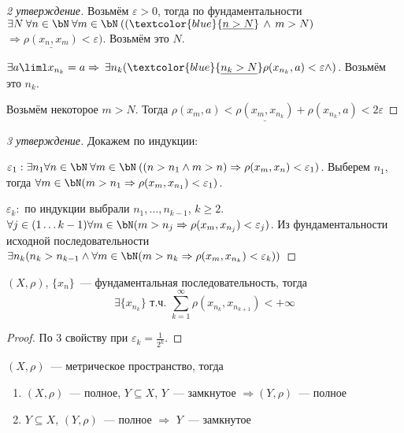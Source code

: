 \documentclass[document]{subfiles}
\begin{document}
\begin{proof}[2 утверждение]
    Возьмём $\varepsilon > 0$, тогда по фундаментальности $\exists N  \: \forall n \in \bN  \: \forall m \in \bN \: ((\textcolor{blue}{\underline{n > N}} \, \land \, m > N) $ $\Rightarrow \underline{\rho(x_n, x_m)} < \varepsilon)$. Возьмём это $N$.

    $\exists a \liml x_{n_k} = a \Rightarrow \: \exists n_k (\textcolor{blue}{\underline{n_k > N}} \rho(x_{n_k}, a) < \varepsilon \land )$. Возьмём это $n_k$.

    Возьмём некоторое $m > N$. Тогда $\rho(x_m, a) < \underline{\rho(x_m, x_{n_k})} + \rho(x_{n_k}, a) < 2 \varepsilon$
\end{proof}
\begin{proof}[3 утверждение]
    Докажем по индукции:

    $\varepsilon_1: \exists n_1 \forall n \in \bN \: \forall m \in \bN \: ((n > n_1 \land m > n) \Rightarrow \rho(x_m,x_n) < \varepsilon_1)$. Выберем $n_1$, тогда $\forall m \in \bN (m > n_1 \Rightarrow \rho(x_m, x_{n_1}) < \varepsilon_1)$.

    $\varepsilon_k:$ по индукции выбрали $n_1, \ldots, n_{k-1}$, $k \geq 2$. $\forall j \in ( 1 \ldots k-1 ) \forall m \in \bN (m > n_j \Rightarrow \rho (x_m, x_{n_j}) < \varepsilon_j)$.
    Из фундаментальности исходной последовательности $\exists n_k (n_k > n_{k-1} \land \forall m \in \bN (m > n_k \Rightarrow \rho (x_m, x_{n_k}) < \varepsilon_k))$
\end{proof}

\begin{corollary}
\label{cor:subseq-metric-sum-converges}
    $(X, \rho)$, $\{x_n\}$~--- фундаментальная последовательность, тогда 
    \[ \exists \{x_{n_k} \} \text { т.ч. } \sum_{k=1}^\infty \rho(x_{n_k}, x_{n_{k+1}}) < + \infty \]
\end{corollary}
\begin{proof}
    По 3 свойству при $\varepsilon_k = \frac{1}{2^k}$.
\end{proof}

\begin{theorem}
    $(X,\rho)$~--- метрическое пространство, тогда
    \begin{enumerate}
        \item $(X, \rho)$~--- полное, $Y \subseteq X$, $Y$~--- замкнутое $\Rightarrow (Y, \rho)$~--- полное
        \item $Y \subseteq X$, $(Y,\rho)$~--- полное $\Rightarrow$ $Y$~--- замкнутое
    \end{enumerate}
\end{theorem}
\end{document}
